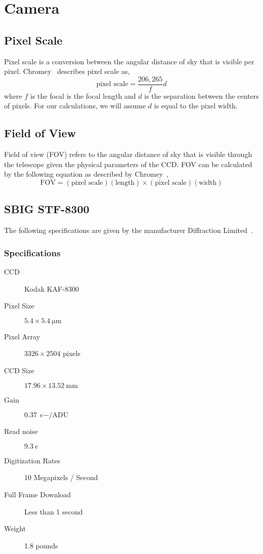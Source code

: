 \section{Camera}
\subsection{Pixel Scale}
Pixel scale is a conversion between the angular distance of sky that is visible per pixel.
Chromey~\cite{chromey_2010} describes pixel scale as,
\begin{equation}
    \text{pixel scale} = \frac{206,265}{f} d
    \label{eq:pixelscale}
\end{equation}
where $f$ is the focal is the focal length and $d$ is the separation between the centers of pixels.
For our calculations, we will assume $d$ is equal to the pixel width.

\subsection{Field of View}
Field of view (FOV) refers to the angular distance of sky that is visible through the telescope given the physical parameters of the CCD\@.
FOV can be calculated by the following equation as described by Chromey~\cite{chromey_2010},
\begin{equation}
    \text{FOV} = (\text{pixel scale})(\text{length}) \times (\text{pixel scale})(\text{width})
    \label{eq:fov}
\end{equation}

\subsection{SBIG STF-8300}
The following specifications are given by the manufacturer Diffraction Limited~\cite{sbig}.
\subsubsection{Specifications}
\begin{description}
    \item[CCD] Kodak KAF-8300
    \item[Pixel Size] $5.4 \times \SI{5.4}{\micro\meter}$
    \item[Pixel Array] $3326 \times 2504$ pixels
    \item[CCD Size] $17.96 \times \SI{13.52}{\milli\meter}$
    \item[Gain] $\SI{0.37}{\elementarycharge-\per\text{ADU}}$
    \item[Read noise] $\SI{9.3}{\elementarycharge}$
    \item[Digitization Rates] 10 Megapixels / Second
    \item[Full Frame Download] Less than 1 second
    \item[Weight] 1.8 pounds
\end{description}

